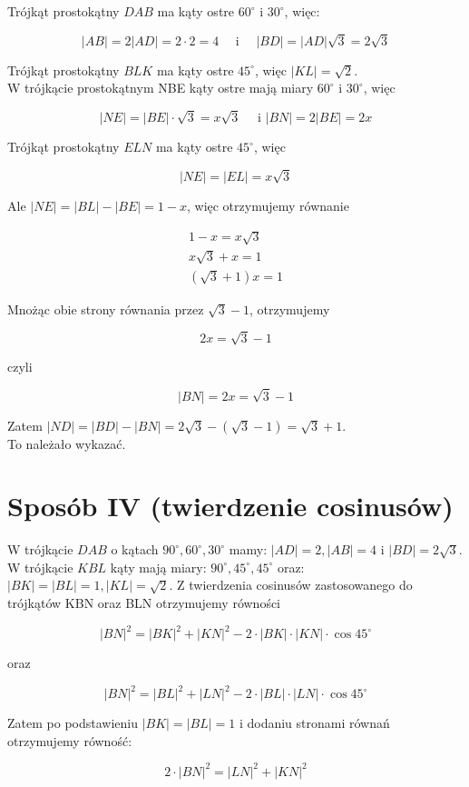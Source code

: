 \documentclass[10pt]{article}
\begin{document}
Trójkąt prostokątny $D A B$ ma kąty ostre $60^{\circ}$ i $30^{\circ}$, więc:

$$
|A B|=2|A D|=2 \cdot 2=4 \quad \text { i } \quad|B D|=|A D| \sqrt{3}=2 \sqrt{3}
$$

Trójkąt prostokątny $B L K$ ma kąty ostre $45^{\circ}$, więc $|K L|=\sqrt{2}$.\\
W trójkącie prostokątnym NBE kąty ostre mają miary $60^{\circ}$ i $30^{\circ}$, więc

$$
|N E|=|B E| \cdot \sqrt{3}=x \sqrt{3} \quad \text { i }|B N|=2|B E|=2 x
$$

Trójkąt prostokątny $E L N$ ma kąty ostre $45^{\circ}$, więc

$$
|N E|=|E L|=x \sqrt{3}
$$

Ale $|N E|=|B L|-|B E|=1-x$, więc otrzymujemy równanie

$$
\begin{gathered}
1-x=x \sqrt{3} \\
x \sqrt{3}+x=1 \\
(\sqrt{3}+1) x=1
\end{gathered}
$$

Mnożąc obie strony równania przez $\sqrt{3}-1$, otrzymujemy

$$
2 x=\sqrt{3}-1
$$

czyli

$$
|B N|=2 x=\sqrt{3}-1
$$

Zatem $|N D|=|B D|-|B N|=2 \sqrt{3}-(\sqrt{3}-1)=\sqrt{3}+1$.\\
To należało wykazać.

\section*{Sposób IV (twierdzenie cosinusów)}
W trójkącie $D A B$ o kątach $90^{\circ}, 60^{\circ}, 30^{\circ}$ mamy: $|A D|=2,|A B|=4$ i $|B D|=2 \sqrt{3}$. W trójkącie $K B L$ kąty mają miary: $90^{\circ}, 45^{\circ}, 45^{\circ}$ oraz: $|B K|=|B L|=1,|K L|=\sqrt{2}$. Z twierdzenia cosinusów zastosowanego do trójkątów KBN oraz BLN otrzymujemy równości

$$
|B N|^{2}=|B K|^{2}+|K N|^{2}-2 \cdot|B K| \cdot|K N| \cdot \cos 45^{\circ}
$$

oraz

$$
|B N|^{2}=|B L|^{2}+|L N|^{2}-2 \cdot|B L| \cdot|L N| \cdot \cos 45^{\circ}
$$

Zatem po podstawieniu $|B K|=|B L|=1$ i dodaniu stronami równań otrzymujemy równość:

$$
2 \cdot|B N|^{2}=|L N|^{2}+|K N|^{2}
$$
\end{document}
